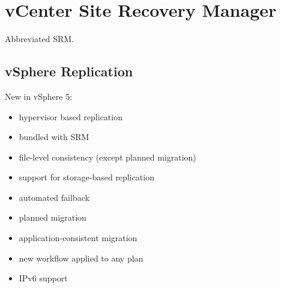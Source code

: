 \section{vCenter Site Recovery Manager}

Abbreviated SRM.

\subsection{vSphere Replication}

New in vSphere 5:

\begin{itemize}

\item hypervisor based replication
\item bundled with SRM
\item file-level consistency (except planned migration)
\item support for storage-based replication
\item automated failback
\item planned migration
\item application-consistent migration
\item new workflow applied to any plan
\item IPv6 support

\end{itemize}
